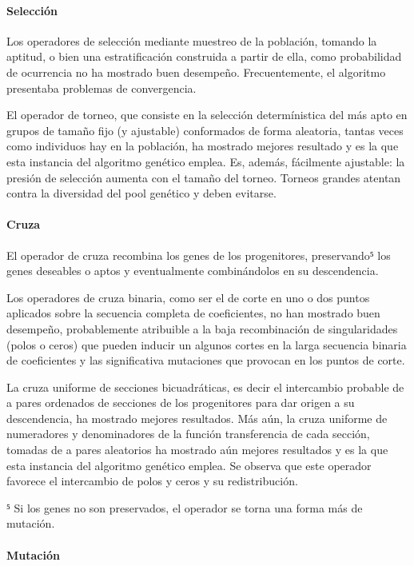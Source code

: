 \documentclass[11pt, journal]{IEEEtran}
\begin{document}
\paragraph{Selección}

Los operadores de selección mediante muestreo de la población, tomando
la aptitud, o bien una estratificación construida a partir de ella, como
probabilidad de ocurrencia no ha mostrado buen desempeño.
Frecuentemente, el algoritmo presentaba problemas de convergencia.

El operador de torneo, que consiste en la selección determínistica del
más apto en grupos de tamaño fijo (y ajustable) conformados de forma
aleatoria, tantas veces como individuos hay en la población, ha mostrado
mejores resultado y es la que esta instancia del algoritmo genético
emplea. Es, además, fácilmente ajustable: la presión de selección
aumenta con el tamaño del torneo. Torneos grandes atentan contra la
diversidad del pool genético y deben evitarse.

\paragraph{Cruza}

El operador de cruza recombina los genes de los progenitores,
preservando⁵ los genes deseables o aptos y eventualmente combinándolos
en su descendencia.

Los operadores de cruza binaria, como ser el de corte en uno o dos
puntos aplicados sobre la secuencia completa de coeficientes, no han
mostrado buen desempeño, probablemente atribuible a la baja
recombinación de singularidades (polos o ceros) que pueden inducir un
algunos cortes en la larga secuencia binaria de coeficientes y las
significativa mutaciones que provocan en los puntos de corte.

La cruza uniforme de secciones bicuadráticas, es decir el intercambio
probable de a pares ordenados de secciones de los progenitores para dar
origen a su descendencia, ha mostrado mejores resultados. Más aún, la
cruza uniforme de numeradores y denominadores de la función
transferencia de cada sección, tomadas de a pares aleatorios ha mostrado
aún mejores resultados y es la que esta instancia del algoritmo genético
emplea. Se observa que este operador favorece el intercambio de polos y
ceros y su redistribución.

⁵ Si los genes no son preservados, el operador se torna una forma más de
mutación.

\paragraph{Mutación}
\end{document}
